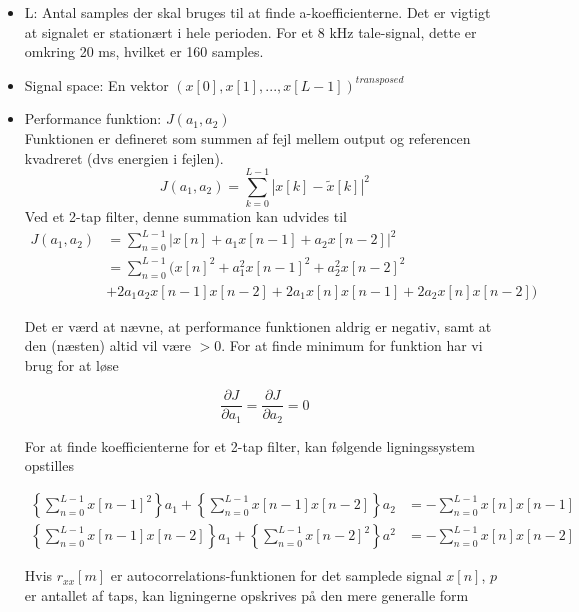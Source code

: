 \begin{itemize}
	\item L: Antal samples der skal bruges til at finde a-koefficienterne. Det er vigtigt at signalet er stationært i hele perioden. For et 8 kHz tale-signal, dette er omkring 20 ms, hvilket er 160 samples.
	\item Signal space: En vektor $(x[0],x[1],...,x[L-1])^{transposed}$
	\item Performance funktion: $J(a_1, a_2)$ \\
	Funktionen er defineret som summen af fejl mellem output og referencen kvadreret (dvs energien i fejlen).
	\begin{equation}
		J(a_1,a_2) = \sum^{L-1}_{k=0} | x[k] - \tilde{x}[k] |^2
	\end{equation}
	Ved et 2-tap filter, denne summation kan udvides til
	\begin{equation}
		\begin{aligned}
		J(a_1,a_2) &= \sum^{L-1}_{n=0} | x[n] + a_1 x[n-1] + a_2 x[n-2] |^2 \\
		&= \sum^{L-1}_{n=0} ( x[n]^2 + a_1^2 x[n-1]^2 + a_2^2 x[n-2]^2 \\ 
		& + 2a_1 a_2 x[n-1] x[n-2] + 2a_1 x[n] x[n-1] + 2a_2 x[n]x[n-2])
		\end{aligned}
	\end{equation}

	Det er værd at nævne, at performance funktionen aldrig er negativ, samt at den (næsten) altid vil være $> 0$. For at finde minimum for funktion har vi brug for at løse

	\begin{equation}
		\frac{\partial J}{\partial a_1} = \frac{\partial J}{\partial a_2} = 0
	\end{equation} 

	For at finde koefficienterne for et 2-tap filter, kan følgende ligningssystem opstilles

	\begin{equation}
		\begin{aligned}
			\left\{ \sum^{L-1}_{n=0}x[n-1]^2 \right\} a_1 + \left\{ \sum^{L-1}_{n=0} x[n-1]x[n-2]\right\} a_2 &= -\sum^{L-1}_{n=0}x[n]x[n-1] \\
			\left\{ \sum^{L-1}_{n=0} x[n-1]x[n-2] \right\} a_1 + \left\{ \sum^{L-1}_{n=0} x[n-2]^2 \right\} a^2 &= -\sum^{L-1}_{n=0}x[n]x[n-2]
		\end{aligned}
	\end{equation}

	Hvis $r_{xx}[m]$ er autocorrelations-funktionen for det samplede signal $x[n]$, $p$ er antallet af taps, kan ligningerne opskrives på den mere generalle form


\end{itemize}
